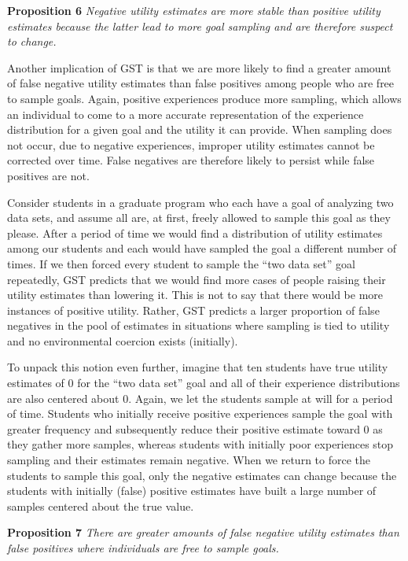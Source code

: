 \documentclass[english,,man]{apa6}
\theoremstyle{definition}
\theoremstyle{definition}
\theoremstyle{definition}
\theoremstyle{remark}
\begin{document}
\textbf{Proposition 6} \emph{Negative utility estimates are more stable
than positive utility estimates because the latter lead to more goal
sampling and are therefore suspect to change.}

Another implication of GST is that we are more likely to find a greater
amount of false negative utility estimates than false positives among
people who are free to sample goals. Again, positive experiences produce
more sampling, which allows an individual to come to a more accurate
representation of the experience distribution for a given goal and the
utility it can provide. When sampling does not occur, due to negative
experiences, improper utility estimates cannot be corrected over time.
False negatives are therefore likely to persist while false positives
are not.

Consider students in a graduate program who each have a goal of
analyzing two data sets, and assume all are, at first, freely allowed to
sample this goal as they please. After a period of time we would find a
distribution of utility estimates among our students and each would have
sampled the goal a different number of times. If we then forced every
student to sample the \enquote{two data set} goal repeatedly, GST
predicts that we would find more cases of people raising their utility
estimates than lowering it. This is not to say that there would be more
instances of positive utility. Rather, GST predicts a larger proportion
of false negatives in the pool of estimates in situations where sampling
is tied to utility and no environmental coercion exists (initially).

To unpack this notion even further, imagine that ten students have true
utility estimates of 0 for the \enquote{two data set} goal and all of
their experience distributions are also centered about 0. Again, we let
the students sample at will for a period of time. Students who initially
receive positive experiences sample the goal with greater frequency and
subsequently reduce their positive estimate toward 0 as they gather more
samples, whereas students with initially poor experiences stop sampling
and their estimates remain negative. When we return to force the
students to sample this goal, only the negative estimates can change
because the students with initially (false) positive estimates have
built a large number of samples centered about the true value.

\textbf{Proposition 7} \emph{There are greater amounts of false negative
utility estimates than false positives where individuals are free to
sample goals.}
\end{document}
